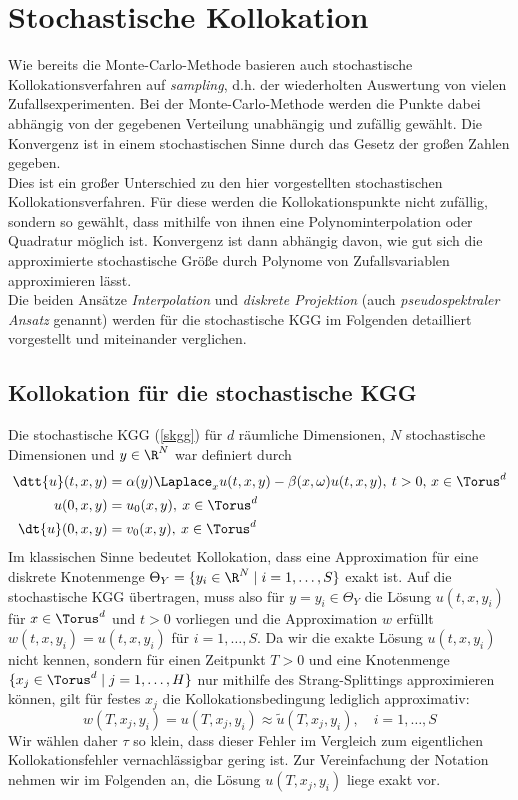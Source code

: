 
\chapter{Stochastische Kollokation}
\label{Chapter4}
Wie bereits die Monte-Carlo-Methode basieren auch stochastische Kollokationsverfahren auf \emph{sampling}, d.h. der wiederholten Auswertung von vielen Zufallsexperimenten. Bei der Monte-Carlo-Methode werden die Punkte dabei abhängig von der gegebenen Verteilung unabhängig und zufällig gewählt. Die Konvergenz ist in einem stochastischen Sinne durch das Gesetz der großen Zahlen gegeben.\\
Dies ist ein großer Unterschied zu den hier vorgestellten stochastischen Kollokationsverfahren. Für diese werden die Kollokationspunkte nicht zufällig, sondern so gewählt, dass mithilfe von ihnen eine Polynominterpolation oder Quadratur möglich ist. Konvergenz ist dann abhängig davon, wie gut sich die approximierte stochastische Größe durch Polynome von Zufallsvariablen approximieren lässt.\\
Die beiden Ansätze \emph{Interpolation} und \emph{diskrete Projektion} (auch \emph{pseudospektraler Ansatz} genannt) werden für die stochastische KGG im Folgenden detailliert vorgestellt und miteinander verglichen.
\section*{Kollokation für die stochastische KGG}
Die stochastische KGG (\ref{skgg}) für $d$ räumliche Dimensionen, $N$ stochastische Dimensionen und $y\in\R^N$ war definiert durch
\begin{align*}
\dtt{u}(t,x,y)&=\alpha(y) \Laplace_x u(t,x,y) - \beta(x,\omega)u(t,x,y), \: t>0, \, x\in \Torus^d\\
u(0,x,y)&=u_0(x,y), \: x\in \Torus^d\\
\dt{u}(0,x,y)&=v_0(x,y), \: x\in \Torus^d
\end{align*}
Im klassischen Sinne bedeutet Kollokation, dass eine Approximation für eine diskrete Knotenmenge $\Theta_Y=\lbrace y_i\in\R^N\mid i=1,\dots,S\rbrace$ exakt ist. Auf die stochastische KGG übertragen, muss also für $y=y_i\in\Theta_Y$ die Lösung $u(t,x,y_i)$ für $x\in\Torus^d$ und $t>0$ vorliegen und die Approximation $w$ erfüllt $w(t,x,y_i)=u(t,x,y_i)$ für $i=1,\dots,S$. Da wir die exakte Lösung $u(t,x,y_i)$ nicht kennen, sondern für einen Zeitpunkt $T>0$ und eine Knotenmenge $\lbrace x_j\in\Torus^d\mid j=1,\dots,H\rbrace$ nur mithilfe des Strang-Splittings approximieren können, gilt für festes $x_j$ die Kollokationsbedingung lediglich approximativ:
\[w(T,x_j,y_i)=u(T,x_j,y_i)\approx \tilde{u}(T,x_j,y_i),\quad i=1,\dots,S\]
Wir wählen daher $\tau$ so klein, dass dieser Fehler im Vergleich zum eigentlichen Kollokationsfehler vernachlässigbar gering ist. Zur Vereinfachung der Notation nehmen wir im Folgenden an, die Lösung $u(T,x_j,y_i)$ liege exakt vor.

